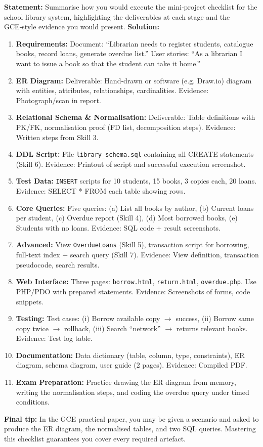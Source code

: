 \documentclass[11pt]{article}
\begin{document}
\begin{exoresolu}
\textbf{Statement:} Summarise how you would execute the mini‑project checklist for the school library system, highlighting the deliverables at each stage and the GCE‑style evidence you would present.
\tcblower
\textbf{Solution:}
\begin{enumerate}
\item \textbf{Requirements:} Document: “Librarian needs to register students, catalogue books, record loans, generate overdue list.” User stories: “As a librarian I want to issue a book so that the student can take it home.”
\item \textbf{ER Diagram:} Deliverable: Hand‑drawn or software (e.g. Draw.io) diagram with entities, attributes, relationships, cardinalities. Evidence: Photograph/scan in report.
\item \textbf{Relational Schema \& Normalisation:} Deliverable: Table definitions with PK/FK, normalisation proof (FD list, decomposition steps). Evidence: Written steps from Skill 3.
\item \textbf{DDL Script:} File \texttt{library\_schema.sql} containing all CREATE statements (Skill 6). Evidence: Printout of script and successful execution screenshot.
\item \textbf{Test Data:} \texttt{INSERT} scripts for 10 students, 15 books, 3 copies each, 20 loans. Evidence: SELECT * FROM each table showing rows.
\item \textbf{Core Queries:} Five queries: (a) List all books by author, (b) Current loans per student, (c) Overdue report (Skill 4), (d) Most borrowed books, (e) Students with no loans. Evidence: SQL code + result screenshots.
\item \textbf{Advanced:} View \texttt{OverdueLoans} (Skill 5), transaction script for borrowing, full‑text index + search query (Skill 7). Evidence: View definition, transaction pseudocode, search results.
\item \textbf{Web Interface:} Three pages: \texttt{borrow.html}, \texttt{return.html}, \texttt{overdue.php}. Use PHP/PDO with prepared statements. Evidence: Screenshots of forms, code snippets.
\item \textbf{Testing:} Test cases: (i) Borrow available copy $\rightarrow$ success, (ii) Borrow same copy twice $\rightarrow$ rollback, (iii) Search “network” $\rightarrow$ returns relevant books. Evidence: Test log table.
\item \textbf{Documentation:} Data dictionary (table, column, type, constraints), ER diagram, schema diagram, user guide (2 pages). Evidence: Compiled PDF.
\item \textbf{Exam Preparation:} Practice drawing the ER diagram from memory, writing the normalisation steps, and coding the overdue query under timed conditions.
\end{enumerate}
\textbf{Final tip:} In the GCE practical paper, you may be given a scenario and asked to produce the ER diagram, the normalised tables, and two SQL queries. Mastering this checklist guarantees you cover every required artefact.
\end{exoresolu}
\end{document}
